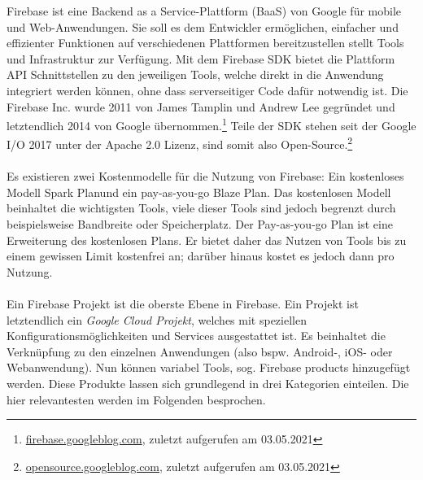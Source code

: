Firebase ist eine Backend as a Service-Plattform (BaaS)  von Google für mobile und Web-Anwendungen. 
Sie soll es dem Entwickler ermöglichen, einfacher und effizienter Funktionen auf verschiedenen Plattformen bereitzustellen stellt Tools und Infrastruktur zur Verfügung.
Mit dem Firebase SDK bietet die Plattform API Schnittstellen zu den jeweiligen Tools, welche direkt in die Anwendung integriert werden können, ohne dass serverseitiger Code dafür notwendig ist.
Die Firebase Inc. wurde 2011 von James Tamplin und Andrew Lee gegründet und letztendlich 2014 von Google übernommen.\footnote{\href{https://firebase.googleblog.com/2014/10/firebase-is-joining-google.html}{firebase.googleblog.com}, zuletzt aufgerufen am 03.05.2021}
Teile der SDK stehen seit der Google I/O 2017 unter der Apache 2.0 Lizenz, sind somit also Open-Source.\footnote{\href{https://opensource.googleblog.com/2017/05/open-sourcing-firebase-sdks.html}{opensource.googleblog.com}, zuletzt aufgerufen am 03.05.2021}\\
\\
Es existieren zwei Kostenmodelle für die Nutzung von Firebase: Ein kostenloses Modell \glqq Spark Plan\grqq und ein pay-as-you-go \glqq Blaze Plan\grqq . Das kostenlosen Modell beinhaltet die wichtigsten Tools, viele dieser Tools sind jedoch begrenzt durch beispielsweise Bandbreite oder Speicherplatz.
Der Pay-as-you-go Plan ist eine Erweiterung des kostenlosen Plans. 
Er bietet daher das Nutzen von Tools bis zu einem gewissen Limit kostenfrei an; darüber hinaus kostet es jedoch dann pro Nutzung.\\
\\
Ein Firebase Projekt ist die oberste Ebene in Firebase. 
Ein Projekt ist letztendlich ein \textit{Google Cloud Projekt}, welches mit speziellen Konfigurationsmöglichkeiten und Services ausgestattet ist. 
Es beinhaltet die Verknüpfung zu den einzelnen Anwendungen (also bspw. Android-, iOS- oder Webanwendung). Nun können variabel Tools, sog. Firebase products hinzugefügt werden. Diese Produkte lassen sich grundlegend in drei Kategorien einteilen. Die hier relevantesten werden im Folgenden besprochen.\cite{firebase2021}

